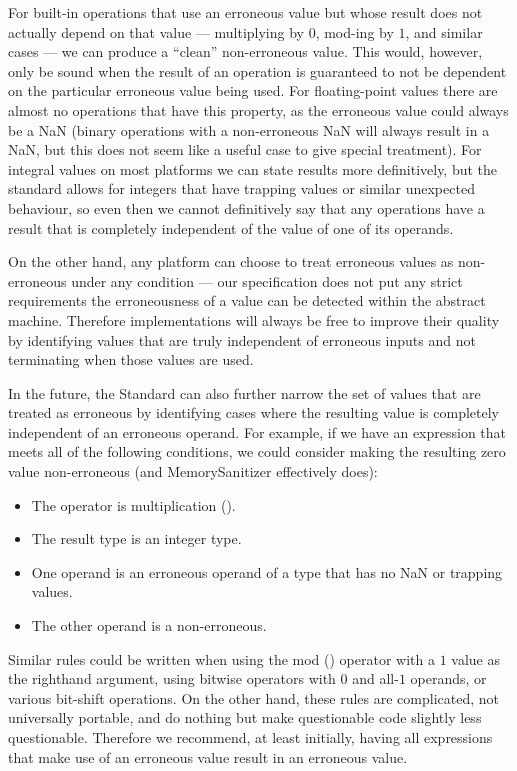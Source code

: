 For built-in operations that use an erroneous value but whose result does not actually depend on that value --- multiplying by $0$, mod-ing by $1$, and similar cases --- we can produce a ``clean'' non-erroneous value.  This would, however, only be sound when the result of an operation is guaranteed to not be dependent on the particular erroneous value being used.  For floating-point values there are almost no operations that have this property, as the erroneous value could always be a NaN (binary operations with a non-erroneous NaN will always result in a NaN, but this does not seem like a useful case to give special treatment).   For integral values on most platforms we can state results more definitively, but the standard allows for integers that have trapping values or similar unexpected behaviour, so even then we cannot definitively say that any operations have a result that is completely independent of the value of one of its operands.

On the other hand, any platform can choose to treat erroneous values as non-erroneous under any condition --- our specification does not put any strict requirements the  erroneousness of a value can be detected within the abstract machine.   Therefore implementations will always be free to improve their quality by identifying values that are truly independent of erroneous inputs and not terminating when those values are used.

In the future, the Standard can also further narrow the set of values that are treated as erroneous by identifying cases where the resulting value is completely independent of an erroneous operand.  For example, if we have an expression that meets all of the following conditions, we could consider making the resulting zero value non-erroneous (and MemorySanitizer effectively does):
\begin{itemize}
\item The operator is multiplication (\tcode{*}).
\item The result type is an integer type.
\item One operand is an erroneous operand of a type that has no NaN or trapping values.
\item The other operand is a non-erroneous.
\end{itemize}
Similar rules could be written when using the mod (\tcode{\%}) operator with a $1$ value as the righthand argument, using bitwise operators with $0$ and all-$1$ operands, or various bit-shift operations.   On the other hand, these rules are complicated, not universally portable, and do nothing but make questionable code slightly less questionable.   Therefore we recommend, at least initially, having all expressions that make use of an erroneous value result in an erroneous value.

